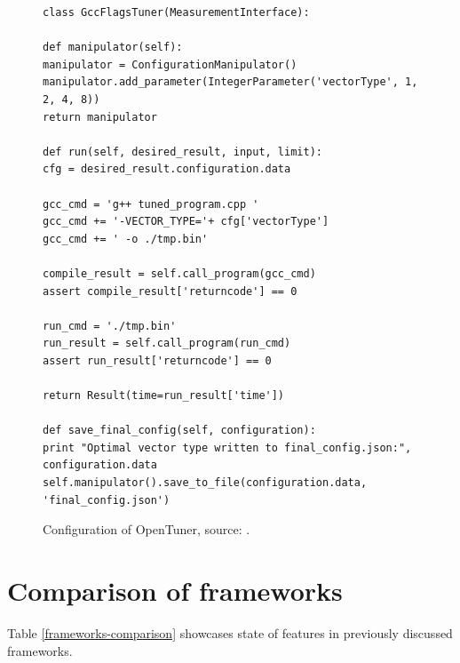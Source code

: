 \documentclass
[
    digital, %
    oneside, %
    table, %
    nolof, %
    nolot, %
    nocover %
]{fithesis3}
\begin{document}
\begin{figure}
\begin{lstlisting}
class GccFlagsTuner(MeasurementInterface):

def manipulator(self):
manipulator = ConfigurationManipulator()
manipulator.add_parameter(IntegerParameter('vectorType', 1, 2, 4, 8))
return manipulator

def run(self, desired_result, input, limit):
cfg = desired_result.configuration.data

gcc_cmd = 'g++ tuned_program.cpp '
gcc_cmd += '-VECTOR_TYPE='+ cfg['vectorType']
gcc_cmd += ' -o ./tmp.bin'

compile_result = self.call_program(gcc_cmd)
assert compile_result['returncode'] == 0

run_cmd = './tmp.bin'
run_result = self.call_program(run_cmd)
assert run_result['returncode'] == 0

return Result(time=run_result['time'])

def save_final_config(self, configuration):
print "Optimal vector type written to final_config.json:", configuration.data
self.manipulator().save_to_file(configuration.data, 'final_config.json')
\end{lstlisting}
\caption{Configuration of OpenTuner, source: \cite{opentuner}.}
\label{opentuner-example}
\end{figure}

\section{Comparison of frameworks}
Table \ref{frameworks-comparison} showcases state of features in previously discussed frameworks.
\end{document}
